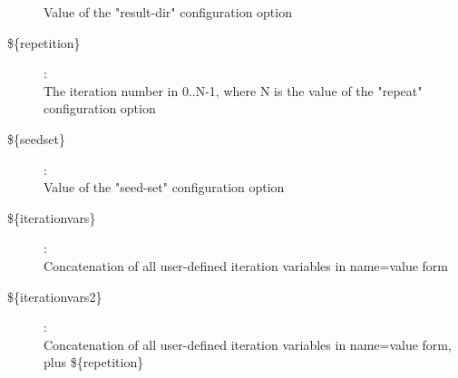 \begin{description}
    Value of the "result-dir" configuration option
\item[\$\{repetition\}] : \\
    The iteration number in 0..N-1, where N is the value of the "repeat"
    configuration option
\item[\$\{seedset\}] : \\
    Value of the "seed-set" configuration option
\item[\$\{iterationvars\}] : \\
    Concatenation of all user-defined iteration variables in name=value form
\item[\$\{iterationvars2\}] : \\
    Concatenation of all user-defined iteration variables in name=value form,
    plus \$\{repetition\}
\end{description}

